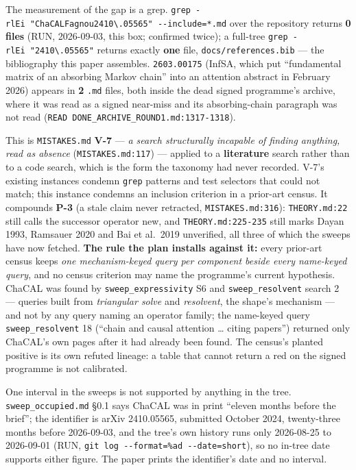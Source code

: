 \documentclass[11pt,a4paper]{article}
\theoremstyle{plain}
\theoremstyle{definition}
\theoremstyle{remark}
\begin{document}
The measurement of the gap is a grep.
\texttt{grep\ -rlEi\ "ChaCAL\textbar{}Fagnou\textbar{}2410\textbackslash{}.05565"\ -\/-include=\textquotesingle{}*.md\textquotesingle{}}
over the repository returns \textbf{0 files} (RUN, 2026-09-03, this box;
confirmed twice); a full-tree
\texttt{grep\ -rlEi\ "2410\textbackslash{}.05565"} returns exactly
\textbf{one} file, \texttt{docs/references.bib} --- the bibliography
this paper assembles. \texttt{2603.00175} (InfSA, which put
``fundamental matrix of an absorbing Markov chain'' into an attention
abstract in February 2026) appears in \textbf{2} \texttt{.md} files,
both inside the dead signed programme's archive, where it was read as a
signed near-miss and its absorbing-chain paragraph was not read
(\texttt{READ\ DONE\_ARCHIVE\_ROUND1.md:1317-1318}).

This is \texttt{MISTAKES.md} \textbf{V-7} --- \emph{a search
structurally incapable of finding anything, read as absence}
(\texttt{MISTAKES.md:117}) --- applied to a \textbf{literature} search
rather than to a code search, which is the form the taxonomy had never
recorded. V-7's existing instances condemn \texttt{grep} patterns and
test selectors that could not match; this instance condemns an inclusion
criterion in a prior-art census. It compounds \textbf{P-3} (a stale
claim never retracted, \texttt{MISTAKES.md:316}): \texttt{THEORY.md:22}
still calls the successor operator new, and \texttt{THEORY.md:225-235}
still marks Dayan 1993, Ramsauer 2020 and Bai et al.~2019 unverified,
all three of which the sweeps have now fetched. \textbf{The rule the
plan installs against it:} every prior-art census keeps \emph{one
mechanism-keyed query per component beside every name-keyed query}, and
no census criterion may name the programme's current hypothesis. ChaCAL
was found by \texttt{sweep\_expressivity} S6 and
\texttt{sweep\_resolvent} search 2 --- queries built from
\emph{triangular solve} and \emph{resolvent}, the shape's mechanism ---
and not by any query naming an operator family; the name-keyed query
\texttt{sweep\_resolvent} 18 (``chain and causal attention \ldots{}
citing papers'') returned only ChaCAL's own pages after it had already
been found. The census's planted positive is its own refuted lineage: a
table that cannot return a red on the signed programme is not
calibrated.

One interval in the sweeps is not supported by anything in the tree.
\texttt{sweep\_occupied.md} §0.1 says ChaCAL was in print ``eleven
months before the brief''; the identifier is arXiv 2410.05565, submitted
October 2024, twenty-three months before 2026-09-03, and the tree's own
history runs only 2026-08-25 to 2026-09-01 (RUN,
\texttt{git\ log\ -\/-format=\%ad\ -\/-date=short}), so no in-tree date
supports either figure. The paper prints the identifier's date and no
interval.
\end{document}
